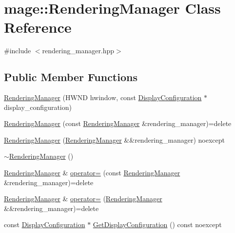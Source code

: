 \hypertarget{classmage_1_1_rendering_manager}{}\section{mage\+:\+:Rendering\+Manager Class Reference}
\label{classmage_1_1_rendering_manager}


{\ttfamily \#include $<$rendering\+\_\+manager.\+hpp$>$}

\subsection*{Public Member Functions}
\begin{DoxyCompactItemize}
\item 
\hyperlink{classmage_1_1_rendering_manager_aaff7375b93bf6019ff7aafb845b1a7a0}{Rendering\+Manager} (H\+W\+ND hwindow, const \hyperlink{structmage_1_1_display_configuration}{Display\+Configuration} $\ast$display\+\_\+configuration)
\item 
\hyperlink{classmage_1_1_rendering_manager_a662f30a01e5e0f1b95f2877981a2f1df}{Rendering\+Manager} (const \hyperlink{classmage_1_1_rendering_manager}{Rendering\+Manager} \&rendering\+\_\+manager)=delete
\item 
\hyperlink{classmage_1_1_rendering_manager_a06c7ad1cb8164b4e33ba52f7d297aa4a}{Rendering\+Manager} (\hyperlink{classmage_1_1_rendering_manager}{Rendering\+Manager} \&\&rendering\+\_\+manager) noexcept
\item 
\hyperlink{classmage_1_1_rendering_manager_a4164e70f014de8d0348c35d5142cedab}{$\sim$\+Rendering\+Manager} ()
\item 
\hyperlink{classmage_1_1_rendering_manager}{Rendering\+Manager} \& \hyperlink{classmage_1_1_rendering_manager_af34a5ba3b8b585124f84f4c70866546b}{operator=} (const \hyperlink{classmage_1_1_rendering_manager}{Rendering\+Manager} \&rendering\+\_\+manager)=delete
\item 
\hyperlink{classmage_1_1_rendering_manager}{Rendering\+Manager} \& \hyperlink{classmage_1_1_rendering_manager_a6f71bc364063de61d07490ef9896158c}{operator=} (\hyperlink{classmage_1_1_rendering_manager}{Rendering\+Manager} \&\&rendering\+\_\+manager)=delete
\item 
const \hyperlink{structmage_1_1_display_configuration}{Display\+Configuration} $\ast$ \hyperlink{classmage_1_1_rendering_manager_a4d134773977675c902974bb3f914370e}{Get\+Display\+Configuration} () const noexcept
\item 

\end{DoxyCompactItemize}
